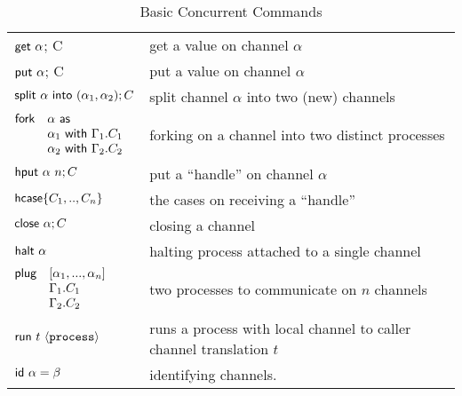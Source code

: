 \documentclass[11pt]{article}
\newcommand{\<}{\langle}
\renewcommand{\>}{\rangle}
\begin{document}
\begin{table}[!h]
\begin{center}

\begin{tabular}{l||l}
${\sf get}~\alpha$; C & get a value on channel $\alpha$ \\
${\sf put}~\alpha$; C & put a value on channel $\alpha$ \\ \hline
${\sf split}~\alpha~{\sf into}~(\alpha_1,\alpha_2); C$ & split channel $\alpha$ into two (new) channels \\
$\!\!\!\begin{array}{ll}{\sf fork} & \alpha~{\sf as} \\
                           & \alpha_1~{\sf with}~\Gamma_1. C_1 \\
                           & \alpha_2~{\sf with}~\Gamma_2. C_2  \end{array}$ & forking on a channel into two distinct processes \\ \hline

${\sf hput}~\alpha~n; C$ & put a ``handle'' on channel $\alpha$ \\
${\sf hcase} \{ C_1,..,C_n\}$ & the cases on receiving a ``handle'' \\ \hline 

${\sf close}~ \alpha; C$ & closing a channel \\
${\sf halt}~\alpha$ & halting process attached to a single channel \\ \hline

$\!\!\!\begin{array}{ll}{\sf plug} & [\alpha_1,...,\alpha_n] \\
                           & \Gamma_1. C_1 \\
                           & \Gamma_2. C_2  \end{array}$ & two processes to communicate on $n$ channels \\ \hline 
${\sf run}~t~\< {\tt process} \>$ & runs a process with local channel to caller channel translation $t$ \\ \hline 


${\sf id}~\alpha = \beta$ & identifying channels.
\end{tabular}
\caption{Basic Concurrent Commands}
\label{concurrent-commands}
\end{center}
\end{table}
\end{document}
